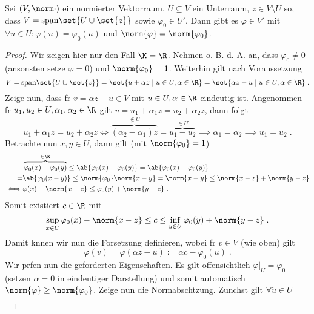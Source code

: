 	\begin{lemma}
		Sei \((V,\norm\cdot)\) ein normierter Vektorraum, \(U\subseteq V\) ein Unterraum, \(z \in V\setminus U\) so, dass \(V = \text{span}\set{U \cup \set{z}}\) sowie \(\varphi_0 \in U'\). Dann gibt es \(\varphi \in V'\) mit \(\forall u \in U: \varphi(u) = \varphi_0(u)\) und \(\norm{\varphi} = \norm{\varphi_0}\).
	\end{lemma}
	\begin{proof}
		Wir zeigen hier nur den Fall \(\K = \R\). Nehmen o. B. d. A. an, dass \(\varphi_0 \neq 0\) (ansonsten setze \(\varphi = 0\)) und \(\norm{\varphi_0} = 1\). Weiterhin gilt nach Voraussetzung
		\[V = \text{span}\set{U\cup\set{z}} = \set{u + \alpha z \;\vert\; u \in U, \alpha \in \R} = \set{\alpha z - u \;\vert\; u \in U, \alpha\in \R}\;.\]
		Zeige nun, dass f\us r \(v = \alpha z - u \in V\) mit \(u\in U, \alpha \in \R\) eindeutig ist. Angenommen f\us r \(u_1, u_2 \in U, \alpha_1, \alpha_2 \in \R\) gilt \(v = u_1 + \alpha_1 z = u_2 + \alpha_2 z\), dann folgt
		\[u_1 + \alpha_1 z = u_2 + \alpha_2 z \iff \overbrace{(\alpha_2 - \alpha_1)z}^{\not\in U} = \overbrace{u_1 - u_2}^{\in U}\implies \alpha_1 = \alpha_2 \implies u_1 = u_2\;.\]
		Betrachte nun \(x,y \in U\), dann gilt (mit \(\norm{\varphi_0} = 1\))
		\begin{align*}&\overbrace{\varphi_0(x) -\varphi_0(y)}^{\in \R} \leq \ab{\varphi_0(x) -\varphi_0(y)} = \ab{\varphi_0(x) -\varphi_0(y)} \\= &\ab{\varphi_0(x-y)} \leq \norm{\varphi_0} \norm{x-y}  
			= \norm{x-y} \leq \norm{x-z} + \norm{y-z} \\ \iff &\varphi(x) - \norm{x-z} \leq \varphi_0(y) + \norm{y-z}\;.
			\end{align*}
			Somit existiert \(c\in \R\) mit 
			\[\sup_{x\in U}\varphi_0(x) - \norm{x-z}\leq c \leq \inf_{y\in U} \varphi_0(y) + \norm{y-z}\;.\]
			Damit k\os nnen wir nun die Forsetzung definieren, wobei f\us r \(v \in V\) (wie oben) gilt
			\[\varphi(v) = \varphi(\alpha z - u) := \alpha c - \varphi_0(u)\;.\]
			Wir pr\us fen nun die geforderten Eigenschaften. Es gilt offensichtlich \(\varphi\vert_U = \varphi_0\) (setzen \(\alpha = 0\) in eindeutiger Darstellung) und somit automatisch 
			\(\norm{\varphi} \geq \norm{\varphi_0}\). Zeige nun die Normabsch\as tzung. Zun\as chst gilt  \(\forall\tilde u \in U\)
			\begin{align*}

\end{align*}
\end{proof}

